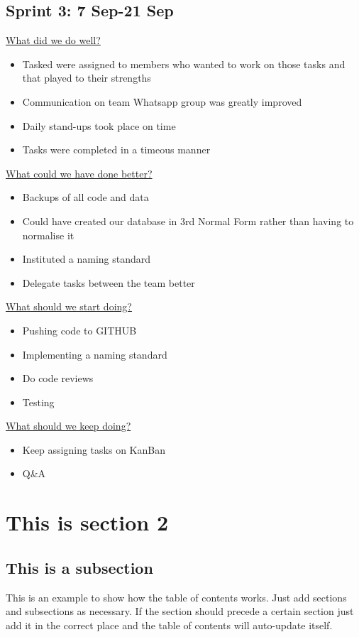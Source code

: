 \documentclass[12pt]{article}
\begin{document}
\subsection{Sprint 3: 7 Sep-21 Sep}
\underline{What did we do well?}
\begin{itemize}
\item Tasked were assigned to members who wanted to work on those tasks and that played to their strengths
\item Communication on team Whatsapp group was greatly improved 
\item Daily stand-ups took place on time
\item Tasks were completed in a timeous manner
\end{itemize}
\underline{What could we have done better?}
\begin{itemize}
\item Backups of all code and data
\item Could have created our database in 3rd Normal Form rather than having to normalise it
\item Instituted a naming standard
\item Delegate tasks between the team better
\end{itemize}
\underline{What should we start doing?}
\begin{itemize}
\item Pushing code to GITHUB 
\item Implementing a naming standard
\item Do code reviews
\item Testing
\end{itemize}
\underline{What should we keep doing?}
\begin{itemize}
\item Keep assigning tasks on KanBan
\item Q\&A
\end{itemize}



\section{This is section 2}
\subsection{This is a subsection}
This is an example to show how the table of contents works. Just add sections and subsections as necessary. If the section should precede a certain section just add it in the correct place and the table of contents will auto-update itself. 
\end{document}
